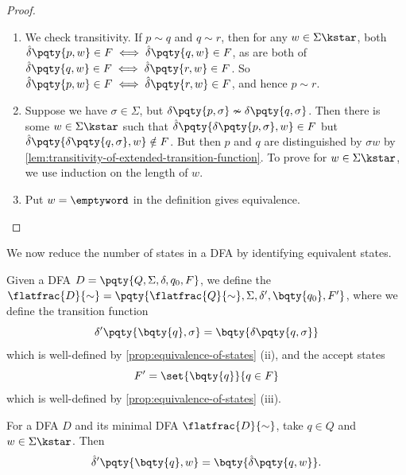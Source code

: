 \begin{proof}
    \begin{enumerate}
        \item We check transitivity. If \(p \sim q\) and \(q \sim r\), then for any \(w \in \Sigma\kstar\), both \(\hat{\delta}\pqty{p, w} \in F \iff \hat{\delta}\pqty{q, w} \in F\), as are both of \(\hat{\delta}\pqty{q, w} \in F \iff \hat{\delta}\pqty{r, w} \in F\). So \(\hat{\delta}\pqty{p, w} \in F \iff \hat{\delta}\pqty{r, w} \in F\), and hence \(p \sim r\).
        \item Suppose we have \(\sigma \in \Sigma\), but \(\delta\pqty{p, \sigma} \nsim \delta\pqty{q, \sigma}\). Then there is some \(w \in \Sigma\kstar\) such that \(\hat{\delta}\pqty{\delta\pqty{p, \sigma}, w} \in F\) but \(\hat{\delta}\pqty{\delta\pqty{q, \sigma}, w} \notin F\). But then \(p\) and \(q\) are distinguished by \(\sigma w\) by \autoref{lem:transitivity-of-extended-transition-function}. To prove for \(w \in \Sigma\kstar\), we use induction on the length of \(w\).
        \item Put \(w = \emptyword\) in the definition gives equivalence.
    \end{enumerate}
\end{proof}

We now reduce the number of states in a DFA by identifying equivalent states.

\begin{definition}
    \label{def:minimal-quotient-dfa}%
    Given a DFA \(D = \pqty{Q, \Sigma, \delta, q_0, F}\), we define the  \(\flatfrac{D}{\sim} = \pqty{\flatfrac{Q}{\sim}, \Sigma, \delta', \bqty{q_0}, F'}\), where we define the transition function
    \[
        \delta' \pqty{\bqty{q}, \sigma} = \bqty{\delta\pqty{q, \sigma}}
    \]
    which is well-defined by \autoref{prop:equivalence-of-states} (ii), and the accept states
    \[
        F' = \set{\bqty{q}}{q \in F}
    \]
    which is well-defined by \autoref{prop:equivalence-of-states} (iii).
\end{definition}

\begin{lemma}
    \label{lem:compatibility-of-extended-transition-functions}%
    For a DFA \(D\) and its minimal DFA \(\flatfrac{D}{\sim}\), take \(q \in Q\) and \(w \in \Sigma\kstar\). Then
    \[
        \hat{\delta}'\pqty{\bqty{q}, w} = \bqty{\hat{\delta}\pqty{q, w}}.
    \]
\end{lemma}

